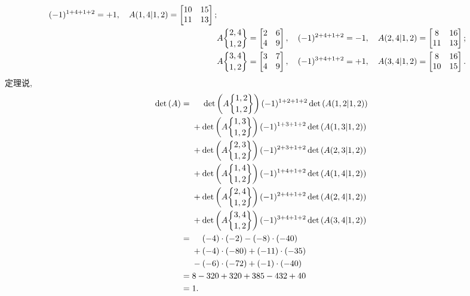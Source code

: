 \documentclass[../libro.tex]{subfiles}
\begin{document}
\begin{example}
\begin{align*}
        (-1)^{1+4+1+2} = +1,
        \quad
        A(1,4|1,2) =
        \begin{bmatrix}
            10 & 15 \\
            11 & 13 \\
        \end{bmatrix};
        \\
        & A\submat{2,4}{1,2} =
        \begin{bmatrix}
            2 & 6 \\
            4 & 9 \\
        \end{bmatrix},
        \quad
        (-1)^{2+4+1+2} = -1,
        \quad
        A(2,4|1,2) =
        \begin{bmatrix}
            8 & 16 \\
            11 & 13 \\
        \end{bmatrix};
        \\
        & A\submat{3,4}{1,2} =
        \begin{bmatrix}
            3 & 7 \\
            4 & 9 \\
        \end{bmatrix},
        \quad
        (-1)^{3+4+1+2} = +1,
        \quad
        A(3,4|1,2) =
        \begin{bmatrix}
            8 & 16 \\
            10 & 15 \\
        \end{bmatrix}.
    \end{align*}
    定理说,
    \begin{align*}
        \det {(A)}
        = {} & \hphantom{{} + {}}
        \det {\left( A\submat{1,2}{1,2} \right)}\,
        (-1)^{1+2+1+2} \det {(A(1,2|1,2))}
        \\
        & + \det {\left( A\submat{1,3}{1,2} \right)}\,
        (-1)^{1+3+1+2} \det {(A(1,3|1,2))}
        \\
        & + \det {\left( A\submat{2,3}{1,2} \right)}\,
        (-1)^{2+3+1+2} \det {(A(2,3|1,2))}
        \\
        & + \det {\left( A\submat{1,4}{1,2} \right)}\,
        (-1)^{1+4+1+2} \det {(A(1,4|1,2))}
        \\
        & + \det {\left( A\submat{2,4}{1,2} \right)}\,
        (-1)^{2+4+1+2} \det {(A(2,4|1,2))}
        \\
        & + \det {\left( A\submat{3,4}{1,2} \right)}\,
        (-1)^{3+4+1+2} \det {(A(3,4|1,2))}
        \\
        = {} & \hphantom{{} + {}}
        (-4) \cdot (-2) - (-8) \cdot (-40)
        \\
        & + (-4) \cdot (-80) + (-11) \cdot (-35)
        \\
        & - (-6) \cdot (-72) + (-1) \cdot (-40)
        \\
        = {} & 8 - 320 + 320 + 385 - 432 + 40
        \\
        = {} & 1.
        \qefhere
    \end{align*}
\end{example}
\end{document}
